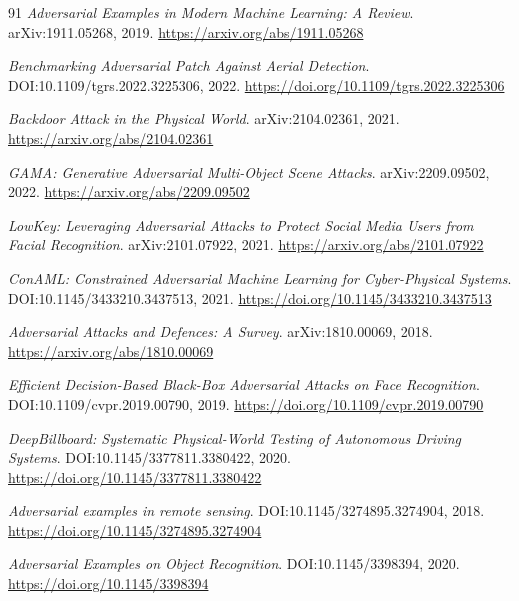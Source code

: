 \documentclass[11pt,a4paper]{article}
\begin{document}
\begin{thebibliography}{91}
\newblock \emph{Adversarial Examples in Modern Machine Learning: A Review}.
\newblock arXiv:1911.05268, 2019.
\newblock \url{https://arxiv.org/abs/1911.05268}

\newblock \emph{Benchmarking Adversarial Patch Against Aerial Detection}.
\newblock DOI:10.1109/tgrs.2022.3225306, 2022.
\newblock \url{https://doi.org/10.1109/tgrs.2022.3225306}

\newblock \emph{Backdoor Attack in the Physical World}.
\newblock arXiv:2104.02361, 2021.
\newblock \url{https://arxiv.org/abs/2104.02361}

\newblock \emph{GAMA: Generative Adversarial Multi-Object Scene Attacks}.
\newblock arXiv:2209.09502, 2022.
\newblock \url{https://arxiv.org/abs/2209.09502}

\newblock \emph{LowKey: Leveraging Adversarial Attacks to Protect Social Media Users from Facial Recognition}.
\newblock arXiv:2101.07922, 2021.
\newblock \url{https://arxiv.org/abs/2101.07922}

\newblock \emph{ConAML: Constrained Adversarial Machine Learning for Cyber-Physical Systems}.
\newblock DOI:10.1145/3433210.3437513, 2021.
\newblock \url{https://doi.org/10.1145/3433210.3437513}

\newblock \emph{Adversarial Attacks and Defences: A Survey}.
\newblock arXiv:1810.00069, 2018.
\newblock \url{https://arxiv.org/abs/1810.00069}

\newblock \emph{Efficient Decision-Based Black-Box Adversarial Attacks on Face Recognition}.
\newblock DOI:10.1109/cvpr.2019.00790, 2019.
\newblock \url{https://doi.org/10.1109/cvpr.2019.00790}

\newblock \emph{DeepBillboard: Systematic Physical-World Testing of Autonomous Driving Systems}.
\newblock DOI:10.1145/3377811.3380422, 2020.
\newblock \url{https://doi.org/10.1145/3377811.3380422}

\newblock \emph{Adversarial examples in remote sensing}.
\newblock DOI:10.1145/3274895.3274904, 2018.
\newblock \url{https://doi.org/10.1145/3274895.3274904}

\newblock \emph{Adversarial Examples on Object Recognition}.
\newblock DOI:10.1145/3398394, 2020.
\newblock \url{https://doi.org/10.1145/3398394}


\end{thebibliography}
\end{document}
